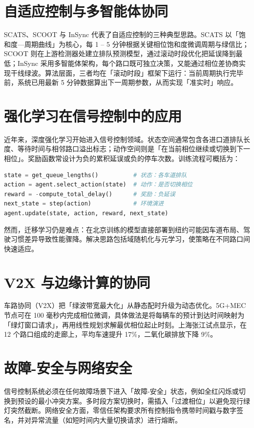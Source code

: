 \chapter{自适应控制与多智能体协同}
SCATS、SCOOT 与 InSync 代表了自适应控制的三种典型思路。SCATS 以「饱和度—周期曲线」为核心，每 1 – 5 分钟根据关键相位饱和度微调周期与绿信比；SCOOT 则在上游检测器处建立排队预测模型，通过滚动时段优化把延误降到最低；InSync 采用多智能体架构，每个路口既可独立决策，又能通过相位差协商实现干线绿波。算法层面，三者均在「滚动时段」框架下运行：当前周期执行完毕前，系统已用最新 5 分钟数据算出下一周期参数，从而实现「准实时」响应。\par
\chapter{强化学习在信号控制中的应用}
近年来，深度强化学习开始进入信号控制领域。状态空间通常包含各进口道排队长度、等待时间与相邻路口溢出标志；动作空间则是「在当前相位继续或切换到下一相位」。奖励函数常设计为负的累积延误或负的停车次数。训练流程可概括为：\par
\begin{lstlisting}[language=python]
state = get_queue_lengths()          # 状态：各车道排队
action = agent.select_action(state)  # 动作：是否切换相位
reward = -compute_total_delay()      # 奖励：负延误
next_state = step(action)            # 环境演进
agent.update(state, action, reward, next_state)
\end{lstlisting}
然而，迁移学习仍是难点：在北京训练的模型直接部署到纽约可能因车道布局、驾驶习惯差异导致性能骤降。解决思路包括域随机化与元学习，使策略在不同路口间快速适应。\par
\chapter{V2X 与边缘计算的协同}
车路协同（V2X）把「绿波带宽最大化」从静态配时升级为动态优化。5G+MEC 节点可在 100 毫秒内完成相位微调，具体做法是将每辆车的预计到达时间映射为「绿灯窗口请求」，再用线性规划求解最优相位起止时刻。上海张江试点显示，在 12 个路口组成的走廊上，平均车速提升 17\%{}，二氧化碳排放下降 9\%{}。\par
\chapter{故障-安全与网络安全}
信号控制系统必须在任何故障场景下进入「故障-安全」状态，例如全红闪烁或切换到预设的最小冲突方案。多时段方案切换时，需插入「过渡相位」以避免现行绿灯突然截断。网络安全方面，零信任架构要求所有控制指令携带时间戳与数字签名，并对异常流量（如短时间内大量切换请求）进行熔断。\par
